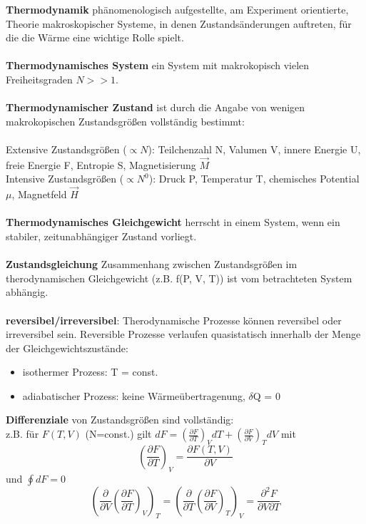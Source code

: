 \documentclass[a4paper,11pt]{scrartcl}
\begin{document}
\textbf{Thermodynamik} phänomenologisch aufgestellte, am Experiment orientierte, Theorie makroskopischer Systeme, in denen Zustandsänderungen auftreten, für die die Wärme eine wichtige Rolle spielt.\\
\\
\textbf{Thermodynamisches System} ein System mit makrokopisch vielen Freiheitsgraden $N>>1$.\\
\\
\textbf{Thermodynamischer Zustand} ist durch die Angabe von wenigen makrokopischen Zustandsgrößen vollständig bestimmt:\\
\\
Extensive Zustandsgrößen ($\propto N$): Teilchenzahl N, Valumen V, innere Energie U, freie Energie F, Entropie S, Magnetisierung $\vec{M}$\\
Intensive Zustandsgrößen ($\propto N^0$): Druck P, Temperatur T, chemisches Potential $\mu$, Magnetfeld $\vec{H}$\\
\\
\textbf{Thermodynamisches Gleichgewicht} herrscht in einem System, wenn ein stabiler, zeitunabhängiger Zustand vorliegt.\\
\\
\textbf{Zustandsgleichung} Zusammenhang zwischen Zustandsgrößen im therodynamischen Gleichgewicht (z.B. f(P, V, T)) ist vom betrachteten System abhängig.\\
\\
\textbf{reversibel/irreversibel}: Therodynamische Prozesse können reversibel oder irreversibel sein. Reversible Prozesse verlaufen quasistatisch innerhalb der Menge der Gleichgewichtszustände: 
\begin{itemize}
 \item isothermer Prozess: T = const.
 \item adiabatischer Prozess: keine Wärmeübertragenung, $\delta$Q = 0
\end{itemize}
\textbf{Differenziale} von Zustandsgrößen sind vollständig:\\
z.B. für $F(T,V)$ (N=const.) gilt $ dF =  \left( \frac{\partial F}{\partial T} \right)_V dT + \left( \frac{ \partial F}{\partial V} \right)_T dV $
mit \begin{equation}
     \left( \frac{\partial F}{ \partial T} \right)_V = \frac{\partial F(T, V)}{ \partial V}
    \end{equation}
und $\oint dF = 0$
\begin{equation}
 \left( \frac{\partial}{\partial V} \left( \frac{\partial F}{\partial T} \right)_V \right)_T =  \left( \frac{\partial}{\partial T} \left( \frac{\partial F}{\partial V} \right)_T \right)_V
= \frac{\partial^2 F}{\partial V \partial T} 
\end{equation}
\end{document}
